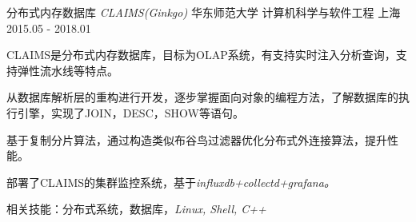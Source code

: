 \begin{cventries}
  \cventry
    {分布式内存数据库  \it{CLAIMS(Ginkgo)}  } 
    {华东师范大学 \quad 计算机科学与软件工程}
    {上海}
    {2015.05 - 2018.01}
    {
      \begin{cvitems}
	\item {CLAIMS是分布式内存数据库，目标为OLAP系统，有支持实时注入分析查询，支持弹性流水线等特点。}
	\item {从数据库解析层的重构进行开发，逐步掌握面向对象的编程方法，了解数据库的执行引擎，实现了JOIN，DESC，SHOW等语句。}
	\item {基于复制分片算法，通过构造类似布谷鸟过滤器优化分布式外连接算法，提升性能。}
	\item {部署了CLAIMS的集群监控系统，基于\it{influxdb+collectd+grafana}。}
	\item {相关技能：分布式系统，数据库，\it{Linux, Shell, C++}}
      \end{cvitems}
    }
\end{cventries}
